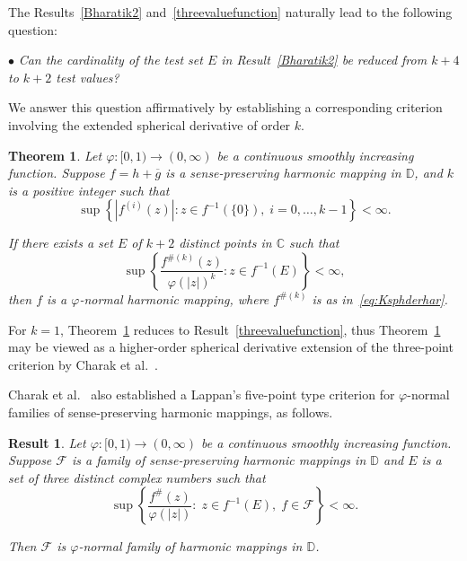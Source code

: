\documentclass[10pt,a4paper]{amsart}
\numberwithin{equation}{section}
\newtheorem{theorem}{Theorem}[section]
\newtheorem{result}{Result}[section]
\begin{document}
The Results~\ref{Bharatik2} and~\ref{threevaluefunction} naturally 
lead to the following question:\smallskip

$\bullet$ {\it Can the cardinality of the test set $E$
 in Result~\ref{Bharatik2} be reduced from $k+4$ 
to $k+2$ test values?} \smallskip

We answer this question affirmatively 
by establishing a corresponding criterion involving the extended spherical
 derivative of order $k$.

\begin{theorem}\label{Mainfunction}
Let $\varphi:[0,1)\to(0,\infty)$ be a continuous smoothly 
increasing
function. Suppose
$f=h+\overline{g}$ is a sense-preserving harmonic
mapping in $\mathbb{D}$, and $k$ is a positive integer such that
\begin{equation}\label{eq:1MainfunHyp}
\sup\left\{
|f^{(i)}(z)|:
z\in f^{-1}(\{0\}),\;
i=0,\ldots,k-1
\right\}<\infty.
\end{equation}

If there exists a set $E$ of $k+2$ distinct 
points in $\mathbb{C}$ such that
\begin{equation}\label{eq:2MainfunHyp}
\sup\left\{
\frac{f^{\#(k)}(z)}{\varphi(|z|)^k}
:
z\in f^{-1}(E)
\right\}
<\infty,
\end{equation}
then $f$ is a $\varphi$-normal harmonic mapping, 
where $f^{\#(k)}$ is as in~\eqref{eq:Ksphderhar}.
\end{theorem}
\medskip

For $k=1$, Theorem~\ref{Mainfunction} reduces to
Result~\ref{threevaluefunction}, thus Theorem~\ref{Mainfunction}
may be viewed as a higher-order spherical derivative extension of the 
three-point criterion by Charak et al.~\cite{charakbharti}.
 \smallskip
 
 Charak et al.~\cite{charakbharti} also established a Lappan's five-point type 
 criterion for $\varphi$-normal families of sense-preserving harmonic mappings,
 as follows.
 
\begin{result}\label{threevalue}\cite[Theorem 1.12]{charakbharti}
Let $\varphi:[0,1)\to(0,\infty)$ be a continuous smoothly increasing
function. Suppose $\mathcal{F}$ is a family of sense-preserving harmonic
mappings in $\mathbb{D}$ and $E$ is a set of three distinct
complex numbers such that
\[
\sup\left\{
\frac{f^{\#}(z)}{\varphi(|z|)}
:\;
z\in f^{-1}(E),\;
f\in\mathcal{F}
\right\}
<\infty.
\]

Then $\mathcal{F}$ is $\varphi$-normal family of harmonic mappings in $\mathbb{D}$.
\end{result}
\end{document}
